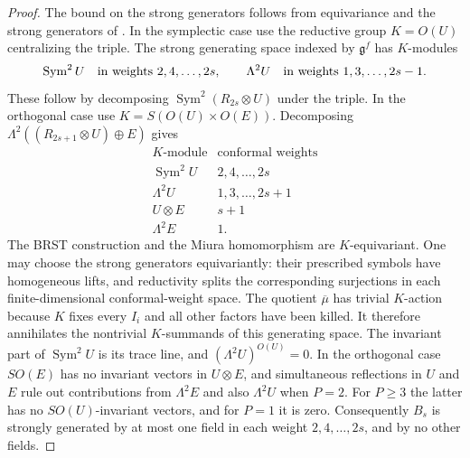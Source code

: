 \documentclass[11pt,a4paper]{amsart}
\numberwithin{equation}{section}
\theoremstyle{definition}
\theoremstyle{remark}
\newcommand{\g}{\mathfrak g}
\begin{document}
\begin{proof}
The bound on the strong generators follows from equivariance and the strong
generators of \cite[Theorem~4.1]{KacWakimoto2004}. In the
symplectic case use the reductive group $K=O(U)$ centralizing the
triple. The strong generating space indexed by $\g^f$ has
$K$-modules
$$
 \operatorname{Sym}^2U\quad\hbox{in weights }2,4,\ldots,2s,
 \qquad
 \Lambda^2U\quad\hbox{in weights }1,3,\ldots,2s-1.
$$
These follow by decomposing
$\operatorname{Sym}^2(R_{2s}\otimes U)$ under the triple.
In the orthogonal case use $K=S(O(U)\times O(E))$. Decomposing
$\Lambda^2((R_{2s+1}\otimes U)\oplus E)$ gives
$$
\begin{array}{c|c}
 K\text{-module}&\text{conformal weights}\\\hline
 \operatorname{Sym}^2U&2,4,\ldots,2s\\
 \Lambda^2U&1,3,\ldots,2s+1\\
 U\otimes E&s+1\\
 \Lambda^2E&1.
\end{array}
$$
The BRST construction and the Miura homomorphism are $K$-equivariant.
One may choose the strong generators equivariantly: their prescribed
symbols have homogeneous lifts, and reductivity splits the
corresponding surjections in each finite-dimensional conformal-weight
space. The quotient $\overline\mu$ has trivial $K$-action because
$K$ fixes every $I_i$ and all other factors have been killed.
It therefore annihilates the nontrivial $K$-summands of this generating
space. The invariant part of $\operatorname{Sym}^2U$ is its trace
line, and $(\Lambda^2U)^{O(U)}=0$.
In the orthogonal case $SO(E)$ has no invariant vectors in $U\otimes E$, and simultaneous
reflections in $U$ and $E$ rule out contributions from $\Lambda^2E$ and also
$\Lambda^2U$ when $P=2$. For $P\ge3$ the latter has no
$SO(U)$-invariant vectors, and for $P=1$ it is zero.
Consequently $B_s$ is strongly generated by at most one field in
each weight $2,4,\ldots,2s$, and by no other fields.


\end{proof}
\end{document}
